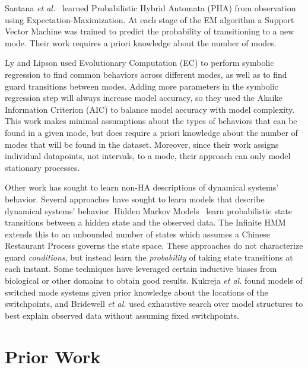 \documentclass[12pt]{report}
\begin{document}
Santana \textit{et al.}~\cite{hybridmodels2015santana} learned Probabilistic Hybrid Automata (PHA) from observation using Expectation-Maximization.  At each stage of the EM algorithm a Support Vector Machine was trained to predict the probability of transitioning to a new mode. Their work requires a priori knowledge about the number of modes.


Ly and Lipson used Evolutionary Computation (EC) to perform symbolic regression \cite{Learning Symbolic Representations of Hybrid Dynamical Systems} to find common behaviors across different modes, as well as to find guard transitions between modes.  Adding more parameters in the symbolic regression step will always increase model accuracy, so they used the Akaike Information Criterion (AIC) to balance model accuracy with model complexity.  This work makes minimal assumptions about the types of behaviors that can be found in a given mode, but does require a priori knowledge about the number of modes that will be found in the dataset. Moreover, since their work assigns individual datapoints, not intervals, to a mode, their approach can only model stationary processes.

Other work has sought to learn non-HA descriptions of dynamical systems' behavior. 
Several approaches have sought to learn models that describe dynamical systems' behavior.
Hidden Markov Models~\cite{baum1966statistical} learn probabilistic state transitions between a hidden state and the observed data.
The Infinite HMM ~\cite{beal2002infinite} extends this to an unbounded number of states which assumes a Chinese Restaurant Process governs the state space.
These approaches do not characterize guard \textit{conditions}, but instead learn the \textit{probability} of taking state transitions at each instant. 
Some techniques have leveraged certain inductive biases from biological or other domains to obtain good results.
Kukreja \textit{et al.}\cite{kukreja2005least} found models of switched mode systems given prior knowledge about the locations of the switchpoints, and Bridewell \textit{et al.}\cite{bridewell2008inductive} used exhaustive search over model structures to best explain observed data without assuming fixed switchpoints.

\section*{Prior Work}
\end{document}

